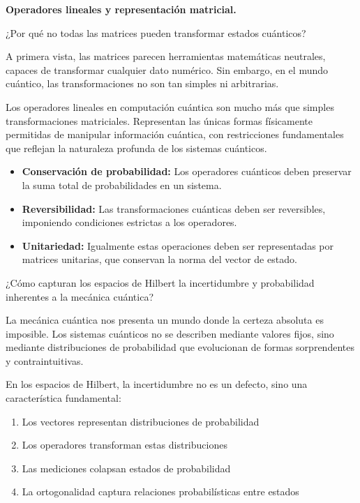 \documentclass[]{unirTema}
\begin{document}
\begin{questions}
\begin{solution}
  \end{solution}
  \question \textbf{Operadores lineales y representación matricial.}

  ¿Por qué no todas las matrices pueden transformar estados cuánticos?

  A primera vista, las matrices parecen herramientas matemáticas neutrales, capaces de transformar cualquier dato numérico. Sin embargo, en el mundo cuántico, las transformaciones no son tan simples ni arbitrarias.

  \begin{solution}
    Los operadores lineales en computación cuántica son mucho más que simples transformaciones matriciales. Representan las únicas formas físicamente permitidas de manipular información cuántica, con restricciones fundamentales que reflejan la naturaleza profunda de los sistemas cuánticos.

    \begin{itemize}
      \item \textbf{Conservación de probabilidad:} Los operadores cuánticos deben preservar la suma total de probabilidades en un sistema.

      \item \textbf{Reversibilidad:} Las transformaciones cuánticas deben ser reversibles, imponiendo condiciones estrictas a los operadores.

      \item \textbf{Unitariedad:} Igualmente estas operaciones deben ser representadas por matrices unitarias, que conservan la norma del vector de estado.
    \end{itemize}
  \end{solution}

  \question ¿Cómo capturan los espacios de Hilbert la incertidumbre y probabilidad inherentes a la mecánica cuántica?

  La mecánica cuántica nos presenta un mundo donde la certeza absoluta es imposible. Los sistemas cuánticos no se describen mediante valores fijos, sino mediante distribuciones de probabilidad que evolucionan de formas sorprendentes y contraintuitivas.

  \begin{solution}
    En los espacios de Hilbert, la incertidumbre no es un defecto, sino una característica fundamental:

    \begin{enumerate}
      \item Los vectores representan distribuciones de probabilidad
      \item Los operadores transforman estas distribuciones
      \item Las mediciones colapsan estados de probabilidad
      \item La ortogonalidad captura relaciones probabilísticas entre estados
    \end{enumerate}


\end{solution}
\end{questions}
\end{document}
